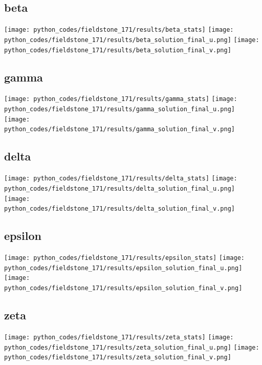 \subsection*{beta}

\begin{center}
\texttt{[image: python\_codes/fieldstone\_171/results/beta\_stats]}
\texttt{[image: python\_codes/fieldstone\_171/results/beta\_solution\_final\_u.png]}
\texttt{[image: python\_codes/fieldstone\_171/results/beta\_solution\_final\_v.png]}
\end{center}

\subsection*{gamma}

\begin{center}
\texttt{[image: python\_codes/fieldstone\_171/results/gamma\_stats]}
\texttt{[image: python\_codes/fieldstone\_171/results/gamma\_solution\_final\_u.png]}
\texttt{[image: python\_codes/fieldstone\_171/results/gamma\_solution\_final\_v.png]}
\end{center}

\subsection*{delta}
\begin{center}
\texttt{[image: python\_codes/fieldstone\_171/results/delta\_stats]}
\texttt{[image: python\_codes/fieldstone\_171/results/delta\_solution\_final\_u.png]}
\texttt{[image: python\_codes/fieldstone\_171/results/delta\_solution\_final\_v.png]}
\end{center}

\subsection*{epsilon}
\begin{center}
\texttt{[image: python\_codes/fieldstone\_171/results/epsilon\_stats]}
\texttt{[image: python\_codes/fieldstone\_171/results/epsilon\_solution\_final\_u.png]}
\texttt{[image: python\_codes/fieldstone\_171/results/epsilon\_solution\_final\_v.png]}
\end{center}

\subsection*{zeta}
\begin{center}
\texttt{[image: python\_codes/fieldstone\_171/results/zeta\_stats]}
\texttt{[image: python\_codes/fieldstone\_171/results/zeta\_solution\_final\_u.png]}
\texttt{[image: python\_codes/fieldstone\_171/results/zeta\_solution\_final\_v.png]}
\end{center}

